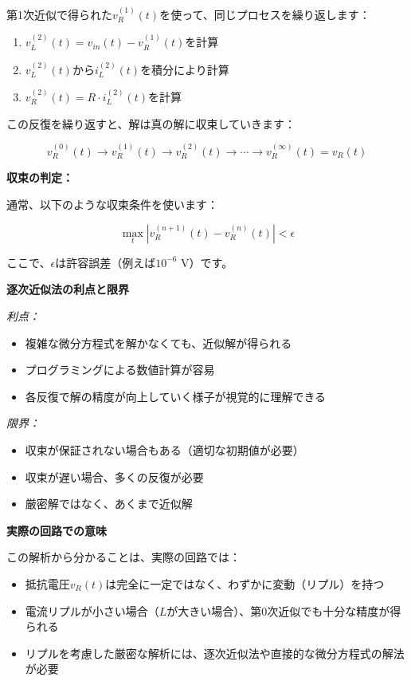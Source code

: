 第1次近似で得られた$v_R^{(1)}(t)$を使って、同じプロセスを繰り返します：

\begin{enumerate}
\item $v_L^{(2)}(t) = v_{in}(t) - v_R^{(1)}(t)$を計算
\item $v_L^{(2)}(t)$から$i_L^{(2)}(t)$を積分により計算
\item $v_R^{(2)}(t) = R \cdot i_L^{(2)}(t)$を計算
\end{enumerate}

この反復を繰り返すと、解は真の解に収束していきます：

\begin{equation}
v_R^{(0)}(t) \rightarrow v_R^{(1)}(t) \rightarrow v_R^{(2)}(t) \rightarrow \cdots \rightarrow v_R^{(\infty)}(t) = v_R(t)
\end{equation}

\textbf{収束の判定：}

通常、以下のような収束条件を使います：

\begin{equation}
\max_t |v_R^{(n+1)}(t) - v_R^{(n)}(t)| < \epsilon
\end{equation}

ここで、$\epsilon$は許容誤差（例えば$10^{-6}$ V）です。

\textbf{逐次近似法の利点と限界}

\textit{利点：}
\begin{itemize}
\item 複雑な微分方程式を解かなくても、近似解が得られる
\item プログラミングによる数値計算が容易
\item 各反復で解の精度が向上していく様子が視覚的に理解できる
\end{itemize}

\textit{限界：}
\begin{itemize}
\item 収束が保証されない場合もある（適切な初期値が必要）
\item 収束が遅い場合、多くの反復が必要
\item 厳密解ではなく、あくまで近似解
\end{itemize}

\textbf{実際の回路での意味}

この解析から分かることは、実際の回路では：

\begin{itemize}
\item 抵抗電圧$v_R(t)$は完全に一定ではなく、わずかに変動（リプル）を持つ
\item 電流リプルが小さい場合（$L$が大きい場合）、第0次近似でも十分な精度が得られる
\item リプルを考慮した厳密な解析には、逐次近似法や直接的な微分方程式の解法が必要
\end{itemize}

